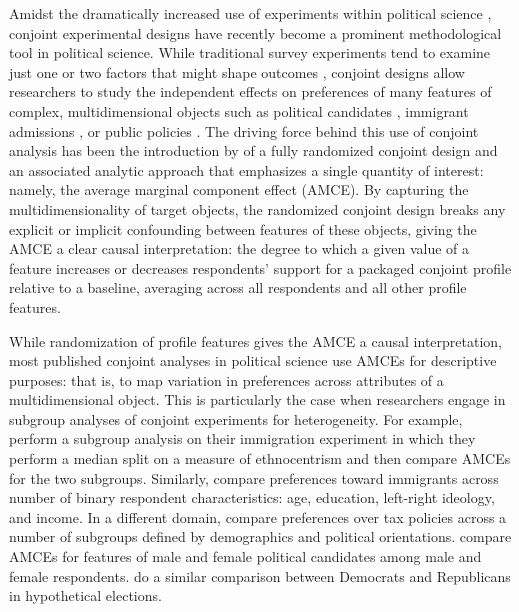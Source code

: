 \documentclass[a4paper,12pt]{article}\usepackage[]{graphicx}\usepackage[]{color}
\begin{document}
Amidst the dramatically increased use of experiments within political science \citep{Druckmanetal2006, Mutz2011}, conjoint experimental designs have recently become a prominent methodological tool in political science. While traditional survey experiments tend to examine just one or two factors that might shape outcomes \citep[see, for reviews,][]{GainesKuklinskiQuirk2007, Sniderman2011}, conjoint designs allow researchers to study the independent effects on preferences of many features of complex, multidimensional objects such as political candidates \citep{Campbelletal2016, TeeleKallaRosenbluth2018}, immigrant admissions \citep{HainmuellerHopkins2015, BansakHainmuellerHangartner2016, WrightLevyCitrin2016}, or public policies \citep{GallegoMarx2017, Hankinson2018}. The driving force behind this use of conjoint analysis has been the introduction by \citet{HainmuellerHopkinsYamamoto2014} of a fully randomized conjoint design and an associated analytic approach that emphasizes a single quantity of interest: namely, the average marginal component effect (AMCE). By capturing the multidimensionality of target objects, the randomized conjoint design breaks any explicit or implicit confounding between features of these objects, giving the AMCE a clear causal interpretation: the degree to which a given value of a feature increases or decreases respondents' support for a packaged conjoint profile relative to a baseline, averaging across all respondents and all other profile features. 

While randomization of profile features gives the AMCE a causal interpretation, most published conjoint analyses in political science use AMCEs for descriptive purposes: that is, to map variation in preferences across attributes of a multidimensional object. This is particularly the case when researchers engage in subgroup analyses of conjoint experiments for heterogeneity. For example, \citet{HainmuellerHopkinsYamamoto2014} perform a subgroup analysis on their immigration experiment in which they perform a median split on a measure of ethnocentrism and then compare AMCEs for the two subgroups. Similarly, \citet{BansakHainmuellerHangartner2016} compare preferences toward immigrants across number of binary respondent characteristics: age, education, left-right ideology, and income. In a different domain, \citet{BallardRosaMartinScheve2016} compare preferences over tax policies across a number of subgroups defined by demographics and political orientations. \citet{TeeleKallaRosenbluth2018} compare AMCEs for features of male and female political candidates among male and female respondents. \citet{KirklandCoppock2017} do a similar comparison between Democrats and Republicans in hypothetical elections.
\end{document}

